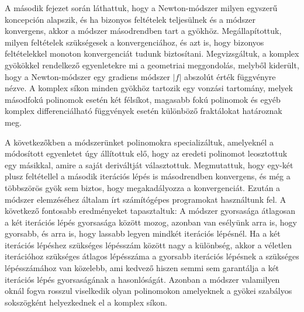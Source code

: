 \documentclass[a4paper,12pt]{report}
\begin{document}
A második fejezet során láthattuk, hogy a Newton-módszer milyen egyszerű koncepción alapszik, és ha bizonyos feltételek teljesülnek és a módszer konvergens, akkor a módszer másodrendben tart a gyökhöz. Megállapítottuk, milyen feltételek szükségesek a konvergenciához, és azt is, hogy bizonyos feltételekkel monoton konvergenciát tudunk biztosítani. Megvizsgáltuk, a komplex gyökökkel rendelkező egyenletekre mi a geometriai meggondolás, melyből kiderült, hogy a Newton-módszer egy gradiens módszer $|f|$ abszolút érték függvényre nézve. A komplex síkon minden gyökhöz tartozik egy vonzási tartomány, melyek másodfokú polinomok esetén két félsíkot, magasabb fokú polinomok és egyéb komplex differenciálható függvények esetén különböző fraktálokat határoznak meg.

A következőkben a módszerünket polinomokra specializáltuk, amelyeknél a módosított egyenletet úgy állítottuk elő, hogy az eredeti polinomot leosztottuk egy másikkal, amire a saját deriváltját választottuk. Megmutattuk, hogy egy-két plusz feltétellel a második iterációs lépés is másodrendben konvergens, és még a többszörös gyök sem biztos, hogy megakadályozza a konvergenciát. Ezután a módszer elemzéséhez általam írt számítógépes programokat használtunk fel. A következő fontosabb eredményeket tapasztaltuk: A módszer gyorsasága átlagosan a két iterációs lépés gyorsasága között mozog, azonban van esélyünk arra is, hogy gyorsabb, és arra is, hogy lassabb legyen mindkét iterációs lépésnél. Ha a két iterációs lépéshez szükséges lépésszám között nagy a különbség, akkor a véletlen iterációhoz szükséges átlagos lépésszáma a gyorsabb iterációs lépésnek a szükséges lépésszámához van közelebb, ami kedvező hiszen semmi sem garantálja a két iterációs lépés gyorsaságának a hasonlóságát. Azonban a módszer valamilyen oknál fogva rosszul viselkedik olyan polinomokon amelyeknek a gyökei szabályos sokszögként helyezkednek el a komplex síkon.
\end{document}
